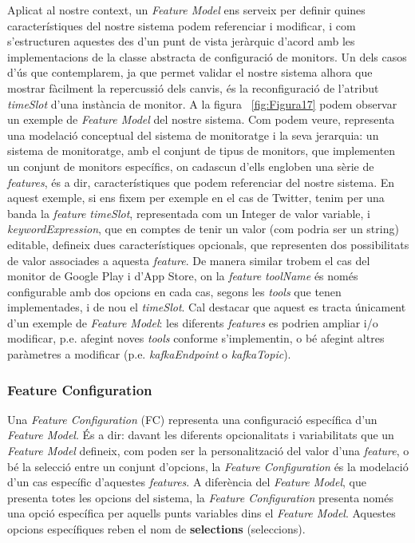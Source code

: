 Aplicat al nostre context, un \textit{Feature Model} ens serveix per definir quines característiques del nostre sistema podem referenciar i modificar, i com s'estructuren aquestes des d'un punt de vista jeràrquic d'acord amb les implementacions de la classe abstracta de configuració de monitors. Un dels casos d'ús que contemplarem, ja que permet validar el nostre sistema alhora que mostrar fàcilment la repercussió dels canvis, és la reconfiguració de l'atribut \textit{timeSlot} d'una instància de monitor. A la figura ~\ref{fig:Figura17} podem observar un exemple de \textit{Feature Model} del nostre sistema. Com podem veure, representa una modelació conceptual del sistema de monitoratge i la seva jerarquia: un sistema de monitoratge, amb el conjunt de tipus de monitors, que implementen un conjunt de monitors específics, on cadascun d'ells engloben una sèrie de \textit{features}, és a dir, característiques que podem referenciar del nostre sistema. En aquest exemple, si ens fixem per exemple en el cas de Twitter, tenim per una banda la \textit{feature} \textit{timeSlot}, representada com un Integer de valor variable, i \textit{keywordExpression}, que en comptes de tenir un valor (com podria ser un string) editable, defineix dues característiques opcionals, que representen dos possibilitats de valor associades a aquesta \textit{feature}. De manera similar trobem el cas del monitor de Google Play i d'App Store, on la \textit{feature} \textit{toolName} és només configurable amb dos opcions en cada cas, segons les \textit{tools} que tenen implementades, i de nou el \textit{timeSlot}. Cal destacar que aquest es tracta únicament d'un exemple de \textit{Feature Model}: les diferents \textit{features} es podrien ampliar i/o modificar, p.e. afegint noves \textit{tools} conforme s'implementin, o bé afegint altres paràmetres a modificar (p.e. \textit{kafkaEndpoint} o \textit{kafkaTopic}).

\subsubsection{Feature Configuration}

Una \textit{Feature Configuration} (FC) representa una configuració específica d'un \textit{Feature Model}. És a dir: davant les diferents opcionalitats i variabilitats que un \textit{Feature Model} defineix, com poden ser la personalització del valor d'una \textit{feature}, o bé la selecció entre un conjunt d'opcions, la \textit{Feature Configuration} és la modelació d'un cas específic d'aquestes \textit{features}. A diferència del \textit{Feature Model}, que presenta totes les opcions del sistema, la \textit{Feature Configuration} presenta només una opció específica per aquells punts variables dins el \textit{Feature Model}. Aquestes opcions específiques reben el nom de \textbf{selections} (seleccions).\\

